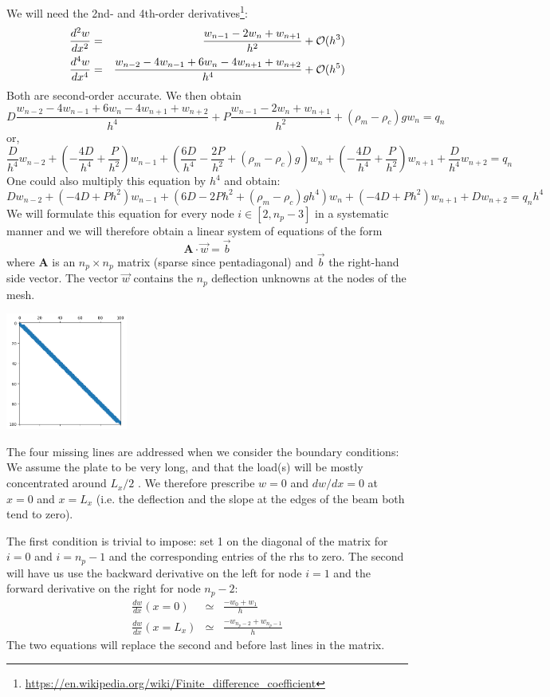 We will need the 2nd- and 4th-order 
derivatives\footnote{\url{https://en.wikipedia.org/wiki/Finite_difference_coefficient}}:
\begin{eqnarray}
\frac{d^2w}{dx^2} &=& \frac{w_{n-1}-2w_n+w_{n+1}}{h^2} 
+{\cal O}(h^3) \\
\frac{d^4w}{dx^4} &=& \frac{w_{n-2}-4w_{n-1}+6w_n-4w_{n+1}+w_{n+2}}{h^4}
+{\cal O}(h^5)
\end{eqnarray}
Both are second-order accurate. We then obtain 
\[
D\frac{w_{n-2}-4w_{n-1}+6w_n-4w_{n+1}+w_{n+2}}{h^4}
+P\frac{w_{n-1}-2w_n+w_{n+1}}{h^2} 
+(\rho_m-\rho_c)g w_n = q_n
\]
or, 
\[
\boxed{
\frac{D}{h^4} w_{n-2}
+\left(-\frac{4D}{h^4}+\frac{P}{h^2}\right)w_{n-1}
+\left(\frac{6D}{h^4}-\frac{2P}{h^2} +(\rho_m-\rho_c)g \right)w_n
+\left(-\frac{4D}{h^4}+\frac{P}{h^2}\right)w_{n+1}
+\frac{D}{h^4} w_{n+2} = q_n
}
\]
One could also multiply this equation by $h^4$ and obtain:
\[
D w_{n-2}
+\left(-4D+Ph^2\right)w_{n-1}
+\left(6D-2Ph^2 +(\rho_m-\rho_c)g h^4 \right)w_n
+\left(-4D+Ph^2\right)w_{n+1}
+D w_{n+2} = q_n h^4
\]
We will formulate this equation for every node $i\in[2,n_p-3]$
in a systematic manner and we will therefore obtain a linear system of equations of the form 
\[
{\bm A} \cdot \vec{w} = \vec{b}
\]
where ${\bm A}$ is an $n_p\times n_p$ matrix (sparse since pentadiagonal) 
and $\vec{b}$ the right-hand side vector. 
The vector $\vec{w}$ contains the $n_p$ deflection unknowns at the nodes of the mesh.

\begin{center}
\includegraphics[width=4cm]{python_codes/fieldstone_105/images/matrix}
\end{center}

The four missing lines are addressed when we consider the boundary conditions:
We assume the plate to be very long, and that the load(s) will be 
mostly concentrated around $L_x/2$ . We therefore 
prescribe $w=0$ and $dw/dx=0$ at $x=0$ and $x=L_x$ (i.e. the deflection and 
the slope at the edges of the beam both tend to zero).

The first condition is trivial to impose: set 1 on the diagonal of the 
matrix for $i=0$ and $i=n_p-1$ and the corresponding entries of the rhs to zero. 
The second will have us use the backward derivative on the left for node $i=1$ and 
the forward derivative on the right for node $n_p-2$:
\begin{eqnarray}
\frac{dw}{dx} (x=0)   &\simeq& \frac{-w_0+w_1}{h} \nonumber\\
\frac{dw}{dx} (x=L_x) &\simeq& \frac{-w_{n_p-2}+w_{n_p-1}}{h}
\end{eqnarray}
The two equations will replace the second and before last 
lines in the matrix.

